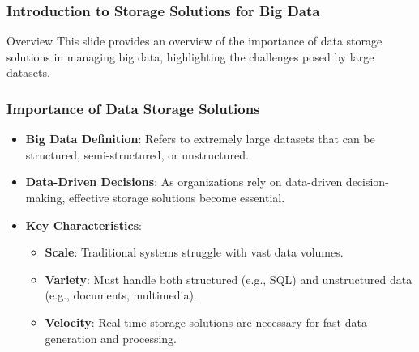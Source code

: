 \documentclass[aspectratio=169]{beamer}
\begin{document}
\frame{\titlepage}

\begin{frame}[fragile]
    \frametitle{Introduction to Storage Solutions for Big Data}
    \begin{block}{Overview}
        This slide provides an overview of the importance of data storage solutions in managing big data, highlighting the challenges posed by large datasets.
    \end{block}
\end{frame}

\begin{frame}[fragile]
    \frametitle{Importance of Data Storage Solutions}
    \begin{itemize}
        \item \textbf{Big Data Definition}: Refers to extremely large datasets that can be structured, semi-structured, or unstructured.
        \item \textbf{Data-Driven Decisions}: As organizations rely on data-driven decision-making, effective storage solutions become essential.
        \item \textbf{Key Characteristics}:
            \begin{itemize}
                \item \textbf{Scale}: Traditional systems struggle with vast data volumes.
                \item \textbf{Variety}: Must handle both structured (e.g., SQL) and unstructured data (e.g., documents, multimedia).
                \item \textbf{Velocity}: Real-time storage solutions are necessary for fast data generation and processing.
            \end{itemize}
    \end{itemize}
\end{frame}
\end{document}
